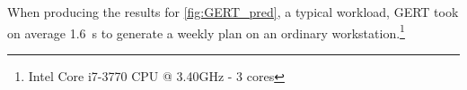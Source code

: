 When producing the results for \cref{fig:GERT_pred}, a typical workload, GERT took on average \SI{1.6}{\second} to generate a weekly plan on an ordinary workstation.\footnote{Intel\textregistered{} Core\texttrademark{} i7-3770 CPU @ 3.40GHz - 3 cores}


